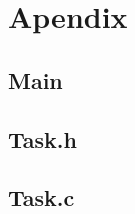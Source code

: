 \section*{\center Apendix}
\subsection*{\large Main}


\newpage
\subsection*{\large Task.h}


\newpage
\subsection*{\large Task.c}

